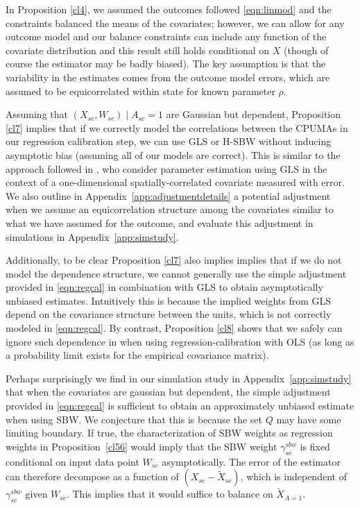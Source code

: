 \begin{remark}
    In Proposition \ref{cl4}, we assumed the outcomes followed \eqref{eqn:linmod} and the constraints balanced the means of the covariates; however, we can allow for any outcome model and our balance constraints can include any function of the covariate distribution and this result still holds conditional on $X$ (though of course the estimator may be badly biased). The key assumption is that the variability in the estimates comes from the outcome model errors, which are assumed to be equicorrelated within state for known parameter $\rho$.
\end{remark}

\begin{remark}\label{remark:obgls}
    Assuming that $(X_{sc}, W_{sc}) \mid A_{sc} = 1$ are Gaussian but dependent, Proposition \ref{cl7} implies that if we correctly model the correlations between the CPUMAs in our regression calibration step, we can use GLS or H-SBW without inducing asymptotic bias (assuming all of our models are correct). This is similar to the approach followed in \cite{huque2014impact}, who consider parameter estimation using GLS in the context of a one-dimensional spatially-correlated covariate measured with error. We also outline in Appendix~\ref{app:adjustmentdetails} a potential adjustment when we assume an equicorrelation structure among the covariates similar to what we have assumed for the outcome, and evaluate this adjustment in simulations in Appendix~\ref{app:simstudy}. 
    
    Additionally, to be clear Proposition \ref{cl7} also implies implies that if we do not model the dependence structure, we cannot generally use the simple adjustment provided in \eqref{eqn:regcal} in combination with GLS to obtain asymptotically unbiased estimates. Intuitively this is because the implied weights from GLS depend on the covariance structure between the units, which is not correctly modeled in \eqref{eqn:regcal}. By contrast, Proposition \ref{cl8} shows that we safely can ignore such dependence in when using regression-calibration with OLS (as long as a probability limit exists for the empirical covariance matrix).
\end{remark}

\begin{remark}\label{remark:sbwspeculation}
    Perhaps surprisingly we find in our simulation study in Appendix~\ref{app:simstudy} that when the covariates are gaussian but dependent, the simple adjustment provided in \eqref{eqn:regcal} is sufficient to obtain an approximately unbiased estimate when using SBW. We conjecture that this is because the set $Q$ may have some limiting boundary. If true, the characterization of SBW weights as regression weights in Proposition~\ref{cl56} would imply that the SBW weight $\gamma_{sc}^{sbw}$ is fixed conditional on input data point $W_{sc}$ asymptotically. 
    The error of the estimator can therefore decompose as a function of $(X_{sc} - \tilde{X}_{sc})$, which is independent of $\gamma_{sc}^{sbw}$ given $W_{sc}$. This implies that it would suffice to balance on $\tilde{X}_{A=1}$.
\end{remark}

